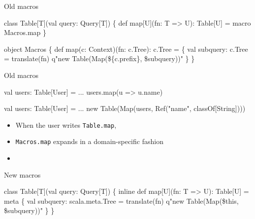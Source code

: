 \documentclass[svgnames,dvipsnames,hyperref={bookmarks=false},usepdftitle=false]{beamer}
\begin{document}
\begin{frame}[fragile]{Old macros}
\begin{semiverbatim}
class Table[T](val query: Query[T]) \{
  def map[U](fn: T => U): Table[U] = macro Macros.map
\}

object Macros \{
  def map(c: Context)(fn: c.Tree): c.Tree = \{
    val subquery: c.Tree = translate(fn)
    q"new Table(Map(\$\{c.prefix\}, \$subquery))"
  \}
\}
\end{semiverbatim}
\end{frame}

\begin{frame}[fragile]{Old macros}
\begin{semiverbatim}
val users: Table[User] = ...
users.map(u => u.name)

                          \arrowdown

val users: Table[User] = ...
new Table(Map(users, Ref("name", classOf[String])))

\end{semiverbatim}

\begin{itemize}
\item When the user writes \texttt{Table.map}, 
\item \texttt{Macros.map} expands in a domain-specific fashion
\item {}
\end{itemize}
\end{frame}

\begin{frame}[fragile]{New macros}
\begin{semiverbatim}
class Table[T](val query: Query[T]) \{
  inline def map[U](fn: T => U): Table[U] = meta \{
    val subquery: scala.meta.Tree = translate(fn)
    q"new Table(Map(\$this, \$subquery))"
  \}
\}
\end{semiverbatim}
\end{frame}
\end{document}
